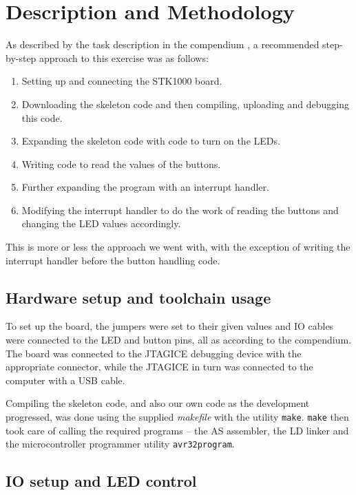 \section{Description and Methodology}

As described by the task description in the compendium \cite{comp}, a
recommended step-by-step approach to this exercise was as follows:

\begin{enumerate}
    \item Setting up and connecting the STK1000 board.
    \item Downloading the skeleton code and then compiling, uploading
    and debugging this code.
    \item Expanding the skeleton code with code to turn on the LEDs.
    \item Writing code to read the values of the buttons.
    \item Further expanding the program with an interrupt handler.
    \item Modifying the interrupt handler to do the work of reading the
    buttons and changing the LED values accordingly.
\end{enumerate}

This is more or less the approach we went with, with the exception of
writing the interrupt handler before the button handling code.

\subsection{Hardware setup and toolchain usage}

To set up the board, the jumpers were set to their given values and IO
cables were connected to the LED and button pins, all as according to
the compendium. The board was connected to the JTAGICE debugging device
with the appropriate connector, while the JTAGICE in turn was connected
to the computer with a USB cable.

Compiling the skeleton code, and also our own code as the development
progressed, was done using the supplied \emph{makefile} with the
utility \texttt{make}. \texttt{make} then took care of calling the
required programs -- the AS assembler, the LD linker and the
microcontroller programmer utility \texttt{avr32program}.

\subsection{IO setup and LED control}

